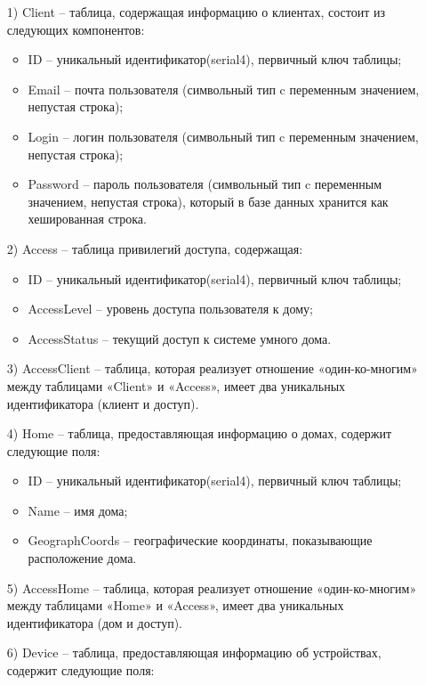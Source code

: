 \begin{enumerate}
    \item[1)] Client -- таблица, содержащая информацию о клиентах, 
    состоит из следующих компонентов:
    \begin{itemize}
        \item ID -- уникальный идентификатор(serial4), первичный ключ таблицы;
        \item Email -- почта пользователя (символьный тип c переменным значением, непустая строка);
        \item Login -- логин пользователя (символьный тип c переменным значением, непустая строка);
        \item Password -- пароль пользователя (символьный тип c переменным значением, непустая строка), который 
        в базе данных хранится как хешированная строка.
    \end{itemize}
    \item[2)] Access -- таблица привилегий доступа, содержащая:
    \begin{itemize}
        \item ID -- уникальный идентификатор(serial4), первичный ключ таблицы;
        \item AccessLevel -- уровень доступа пользователя к дому;
        \item AccessStatus -- текущий доступ к системе умного дома.
    \end{itemize}
    \item[3)] AccessClient -- таблица, которая реализует отношение 
    «один-ко-многим» между таблицами «Client» и «Access», 
    имеет два уникальных идентификатора (клиент и доступ).
    \item[4)] Home -- таблица, предоставляющая информацию о домах, содержит следующие поля:
    \begin{itemize}
        \item ID -- уникальный идентификатор(serial4), первичный ключ таблицы;
        \item Name -- имя дома;
        \item GeographCoords -- географические координаты, показывающие расположение дома.
    \end{itemize}
    \item[5)] AccessHome -- таблица, которая реализует отношение 
    «один-ко-многим» между таблицами «Home» и «Access»,
    имеет два уникальных идентификатора (дом и доступ).
    \item[6)] Device -- таблица, предоставляющая информацию об устройствах, содержит следующие поля:

\end{enumerate}
